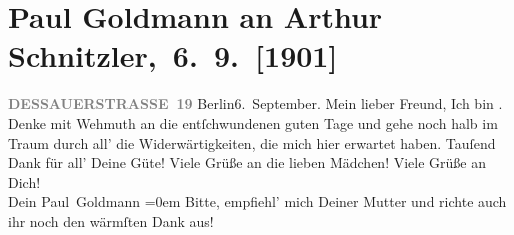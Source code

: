 

         
         \renewcommand{\erwaehntePersonen}{Personen: Olga Schnitzler, Louise Schnitzler, Elisabeth Steinrück}
         \renewcommand{\erwaehnteOrte}{Orte: Berlin, Dessauer Straße, Wien}
         \renewcommand{\erwaehnteWerke}{}
               \section[ Paul Goldmann an Arthur Schnitzler, 6. 9. {[}1901{]}]{ Paul Goldmann an Arthur Schnitzler, 6. 9. {[}1901{]}}\nopagebreak{}\rehead{ }\begin{ledgroupsized}[t]{13cm}\normalsize\beginnumbering \toendnotes[C]{\smallbreak\pagebreak[2]} 
\toendnotes[C]{\smallbreak}\pstart
           \noindent{}\raggedleft{}{\pb}\textcolor{gray}{\textbf{DESSAUERSTRASSE 19}}\pend
           \pstart
           Berlin6. September.\pend
           \pstart\center{}Mein lieber Freund,\pend\pstart
           Ich bin \label{K_L03081-2v}\label{K_L03081-2h}. Denke mit Wehmuth an die
               entſchwundenen guten Tage und gehe noch halb im Traum durch all’ die
               Widerwärtigkeiten, die mich hier erwartet haben. Tauſend Dank für all’ Deine Güte!
               Viele Grüße an die lieben Mädchen!\pend
           \pstart
           Viele Grüße an Dich! {\\[\baselineskip]}Dein \spacefill\mbox{Paul Goldmann}\pend
           \leftskip=0em{}\pstart
           \noindent{}Bitte, empfiehl’ mich Deiner Mutter und richte auch ihr noch den wärmſten Dank aus!\pend
           
         
         \endnumbering{}\end{ledgroupsized}  \newcommand{\dateiname}{L03081}\newcommand{\titel}{Paul Goldmann an Arthur Schnitzler, 6. 9. [1901]}\newcommand{\editorInnen}{Martin Anton Müller und Laura Untner}
      
